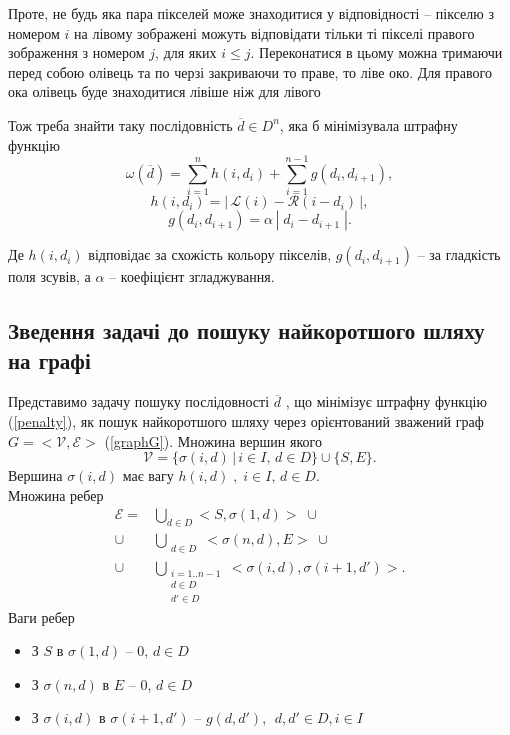 \documentclass{ConfFTI}
\begin{document}
Проте, не будь яка пара пікселей може знаходитися у відповідності -- пікселю з номером $i$ на лівому зображені можуть відповідати тільки ті пікселі  правого зображення з номером $j$, для яких $i \leq j$. Переконатися в цьому можна тримаючи перед собою олівець та по черзі закриваючи то праве, то ліве око. Для правого ока олівець буде знаходитися лівіше ніж для лівого

Тож треба знайти таку послідовність $\overline{d} \in {D}^n$, яка б мінімізувала штрафну функцію
\begin{equation}
\omega(\overline{d}) = \sum\limits_{i = 1}^n h(i, d_i) + \sum\limits_{i = 1}^{n-1} g(d_i, d_{i + 1}),
\label{penalty}
\end{equation}
$$ h(i, d_i) = | \, \mathcal{L} (i) - \mathcal{R} (i - d_i) \, |, $$ 
$$ g(d_i, d_{i+1}) = \alpha \, | \; d_i - d_{i+1}\; |. $$

Де $ h(i, d_i) $ відповідає за схожість кольору пікселів, $ g(d_i, d_{i+1}) $ -- за гладкість поля зсувів, а $ \alpha $ -- коефіцієнт згладжування.


\subsection{Зведення задачі до пошуку найкоротшого  шляху на графі}\label{G_definition}
Представимо задачу пошуку послідовності $ \overline{d} $ , що мінімізує штрафну функцію (\ref{penalty}), як пошук найкоротшого шляху через орієнтований зважений граф $G = <\mathcal{V}, \mathcal{E}>$ (\ref{graphG}). Множина вершин якого
$$ \mathcal{V} = \{ \sigma(i, d) \, | \, i \in I, \, d \in D \} \cup \{ S, E \}.$$ Вершина $\sigma(i, d)$ має вагу $h(i, d) \;, \; i \in I, \, d \in D .$\\
Множина ребер
\begin{align*}
\mathcal{E} = &\bigcup\limits_{d \in D }<S, \sigma(1, d) > \; \cup 
\\ \cup &\bigcup\limits_{\substack{d \in D}} <\sigma(n, d), E > \; \cup 
\\ \cup &\bigcup\limits_{\substack{i = 1..n-1 \\d \in D \\d' \in D}} <\sigma(i, d), \sigma(i+1, d') >.
\end{align*}
Ваги ребер
\begin{itemize}
\item З $ S $ в $ \sigma(1, d) $ -- $ 0 $, $ d \in D $
\item З $ \sigma(n, d) $ в $ E $ -- $ 0 $, $ d \in D $
\item З $ \sigma(i, d) $ в $\sigma(i + 1, d ') $ -- $ g(d, d') $, $ \; d, d' \in D, i \in I $
\end{itemize}
\end{document}
